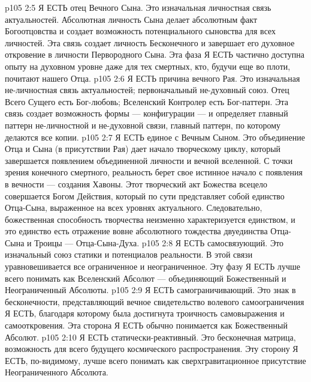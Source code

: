 \vs p105 2:5 \bibnobreakspace {} Я ЕСТЬ отец Вечного Сына. Это изначальная личностная связь актуальностей. Абсолютная личность Сына делает абсолютным факт Богоотцовства и создает возможность потенциального сыновства для всех личностей. Эта связь создает личность Бесконечного и завершает его духовное откровение в личности Первородного Сына. Эта фаза Я ЕСТЬ частично доступна опыту на духовном уровне даже для тех смертных, кто, будучи еще во плоти, почитают нашего Отца.
\vs p105 2:6 \pc {}\bibnobreakspace {}  Я ЕСТЬ причина вечного Рая. Это изначальная не\hyp{}личностная связь актуальностей; первоначальный не\hyp{}духовный союз. Отец Всего Сущего есть Бог\hyp{}любовь; Вселенский Контролер есть Бог\hyp{}паттерн. Эта связь создает возможность формы --- конфигурации --- и определяет главный паттерн не\hyp{}личностной и не\hyp{}духовной связи, главный паттерн, по которому делаются все копии.
\vs p105 2:7 \pc {}\bibnobreakspace {} Я ЕСТЬ единое с Вечным Сыном. Это объединение Отца и Сына (в присутствии Рая) дает начало творческому циклу, который завершается появлением объединенной личности и вечной вселенной. С точки зрения конечного смертного, реальность берет свое истинное начало с появления в вечности --- создания Хавоны. Этот творческий акт Божества всецело совершается Богом Действия, который по сути представляет собой единство Отца\hyp{}Сына, выраженное на всех уровнях актуального. Следовательно, божественная способность творчества неизменно характеризуется единством, и это единство есть отражение вовне абсолютного тождества двуединства Отца\hyp{}Сына и Троицы --- Отца\hyp{}Сына\hyp{}Духа.
\vs p105 2:8 \pc {}\bibnobreakspace {} Я ЕСТЬ самосвязующий. Это изначальный союз статики и потенциалов реальности. В этой связи уравновешивается все ограниченное и неограниченное. Эту фазу Я ЕСТЬ лучше всего понимать как Вселенский Абсолют --- объединяющий Божественный и Неограниченный Абсолюты.
\vs p105 2:9 \pc {}\bibnobreakspace {} Я ЕСТЬ самограничивающий. Это знак в бесконечности, представляющий вечное свидетельство волевого самоограничения Я ЕСТЬ, благодаря которому была достигнута троичность самовыражения и самооткровения. Эта сторона Я ЕСТЬ обычно понимается как Божественный Абсолют.
\vs p105 2:10 \pc {}\bibnobreakspace {} Я ЕСТЬ статически\hyp{}реактивный. Это бесконечная матрица, возможность для всего будущего космического распространения. Эту сторону Я ЕСТЬ, по\hyp{}видимому, лучше всего понимать как сверхгравитационное присутствие Неограниченного Абсолюта.
